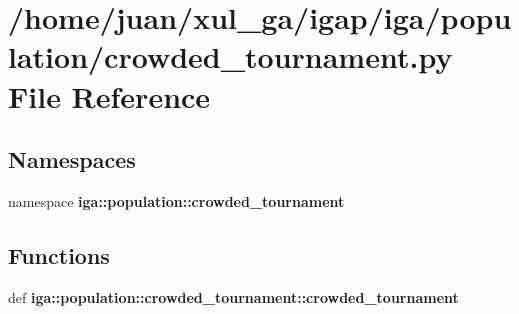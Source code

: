 \section{/home/juan/xul\_\-ga/igap/iga/population/crowded\_\-tournament.py File Reference}
\label{crowded__tournament_8py}
\subsection*{Namespaces}
\begin{CompactItemize}
\item 
namespace {\bf iga::population::crowded\_\-tournament}
\end{CompactItemize}
\subsection*{Functions}
\begin{CompactItemize}
\item 
def {\bf iga::population::crowded\_\-tournament::crowded\_\-tournament}
\end{CompactItemize}
